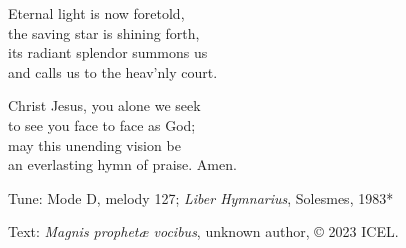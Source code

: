 \hymn



\begin{underhymnverse}
Eternal light is now foretold,\\
the saving star is shining forth,\\
its radiant splendor summons us\\
and calls us to the heav’nly court.

Christ Jesus, you alone we seek\\
to see you face to face as God;\\
may this unending vision be\\
an everlasting hymn of praise. Amen.
\end{underhymnverse}


\begin{hymnsource}
Tune: Mode D, melody 127; \emph{Liber Hymnarius}, Solesmes, 1983*

Text: \emph{Magnis prophetæ vocibus}, unknown author, © 2023 ICEL.
\end{hymnsource}

